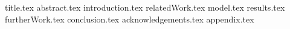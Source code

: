 \documentclass[11pt]{llncs}
\begin{document}
{title.tex}
\thispagestyle{plain}
{abstract.tex}
{introduction.tex}
{relatedWork.tex}
{model.tex}
{results.tex}
{furtherWork.tex}
{conclusion.tex}
{acknowledgements.tex}
{appendix.tex}

\end{document}
